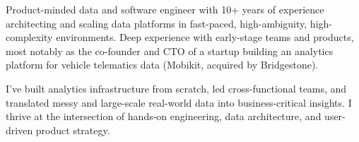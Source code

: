 

\begin{cvparagraph}


Product-minded data and software engineer with 10+ years of experience architecting and scaling data platforms in fast-paced, high-ambiguity, high-complexity environments. Deep experience with early-stage teams and products, most notably as the co-founder and CTO of a startup building an analytics platform for vehicle telematics data (Mobikit, acquired by Bridgestone).

I’ve built analytics infrastructure from scratch, led cross-functional teams, and translated messy and large-scale real-world data into business-critical insights. I thrive at the intersection of hands-on engineering, data architecture, and user-driven product strategy.

\end{cvparagraph}
